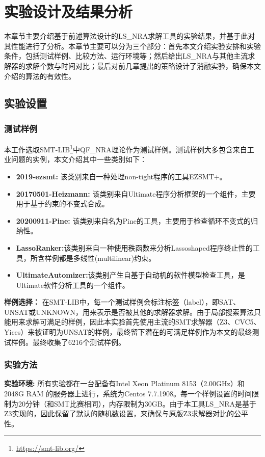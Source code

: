 \chapter{实验设计及结果分析}\label{chap:Result}

本章节主要介绍基于前述算法设计的LS\_NRA求解工具的实验结果，并基于此对其性能进行了分析。本章节主要可以分为三个部分：首先本文介绍实验安排和实验条件，包括测试样例、比较方法、运行环境等；然后给出LS\_NRA与其他主流求解器的求解个数与时间对比；最后对前几章提出的策略设计了消融实验，确保本文介绍的算法的有效性。

\section{实验设置}
\subsection{测试样例}
本工作选取SMT-LIB\footnote{\url{https://smt-lib.org/}}中QF\_NRA理论作为测试样例。测试样例大多包含来自工业问题的实例，本文介绍其中一些类别如下：

\begin{itemize}
    \item \textbf{2019-ezsmt\cite{SusmanL16, ShenL18}:} 该类别来自一种处理non-tight程序的工具EZSMT+。
    \item \textbf{20170501-Heizmann\cite{Heizmann}:} 该类别来自Ultimate程序分析框架的一个组件，主要用于基于约束的不变式合成。
    \item \textbf{20200911-Pine\cite{Pine}:} 该类别来自名为Pine的工具，主要用于检查循环不变式的归纳性。
    \item \textbf{LassoRanker\cite{LeikeH15, HeizmannHLP13, Lasso3}:}该类别来自一种使用秩函数来分析Lassoshaped程序终止性的工具，所含样例都是多线性(multilinear)约束。
    \item \textbf{UltimateAutomizer:}该类别产生自基于自动机的软件模型检查工具，是Ultimate软件分析工具的一个组件。
\end{itemize}

\textbf{样例选择：} 在SMT-LIB中，每一个测试样例会标注标签（label），即SAT、UNSAT或UNKNOWN，用来表示是否被其他的求解器求解。由于局部搜索算法只能用来求解可满足的样例，因此本实验首先使用主流的SMT求解器（Z3、CVC5、Yices）来被证明为UNSAT的样例，最终留下潜在的可满足样例作为本文的最终测试样例。最终收集了6216个测试样例。


\subsection{实验方法}
 \textbf{实验环境:} 所有实验都在一台配备有Intel Xeon Platinum 8153（2.00GHz）和2048G RAM 的服务器上进行，系统为Centos 7.7.1908。每一个样例设置的时间限制为20分钟（和SMT比赛相同），内存限制为30GB。由于本工具LS\_NRA是基于Z3实现的，因此保留了默认的随机数设置，来确保与原版Z3求解器对比的公平性。

